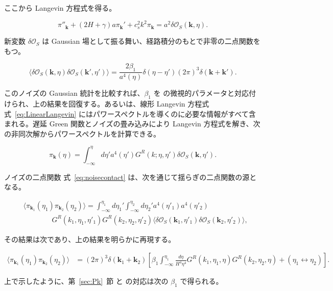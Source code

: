 \documentclass[a4paper,11pt]{ltjsarticle}
\numberwithin{equation}{section}
\def\bfk{\textbf{k}}
\newcommand{\Os}{\delta \mathcal{O}_{S}}
\newcommand{\Eq}[1]{Eq.~(\ref{#1})}
\newcommand{\Eqs}[1]{Eqs.~(\ref{#1})}
\newcommand{\Sec}[1]{Sec.~\ref{#1}}
\renewcommand{\Eq}[1]{式~\eqref{#1}}
\renewcommand{\Eqs}[1]{式~\eqref{#1}}
\renewcommand{\Sec}[1]{第~\ref{#1}~節}
\begin{document}
ここから Langevin 方程式を得る。

\begin{equation}\label{eq:LinearLangevin}
    \pi''_{\bfk} +\left( 2H + \gamma\right)a\pi_{\bfk}'+c_{s}^{2}k^{2}\pi_{\bfk}=a^2 \Os(\bfk, \eta).
\end{equation}

新変数 $\Os$ は Gaussian 場として振る舞い、経路積分のもとで非零の二点関数をもつ。

\begin{equation}\label{eq:noisecontact}
    \langle\Os(\bfk,\eta)\Os(\bfk',\eta')\rangle=\frac{2\beta_{1}}{a^{4}(\eta)}\delta(\eta-\eta')(2\pi)^3\delta(\bfk+\bfk').
\end{equation}

このノイズの Gaussian 統計を比較すれば、$\beta_1$ を \cite{Creminelli:2023aly} の微視的パラメータと対応付けられ、上の結果を回復する。あるいは、線形 Langevin 方程式 \Eqs{eq:LinearLangevin} にはパワースペクトルを導くのに必要な情報がすべて含まれる。遅延 Green 関数とノイズの畳み込みにより Langevin 方程式を解き、次の非同次解からパワースペクトルを計算できる。

\begin{equation}\label{eq:GRxifree}
    \pi_{\bfk}(\eta)=\int_{-\infty}^{\eta}d\eta'a^{4}(\eta')G^R(k;\eta,\eta')\Os(\bfk,\eta').
\end{equation}

ノイズの二点関数 \Eq{eq:noisecontact} は、次を通じて揺らぎの二点関数の源となる。

\begin{align}
    &\langle\pi_{\bfk_{1}}(\eta_{1})\pi_{\bfk_{2}}(\eta_{2})\rangle=\int_{-\infty}^{\eta_{1}}d\eta_{1}'\int_{-\infty}^{\eta_{2}}d\eta_{2}'a^{4}(\eta'_{1})a^{4}(\eta'_{2})\nonumber \\
    &\qquad \qquad  G^{R}(k_1,\eta_{1},\eta'_{1})G^{R}(k_2, \eta_{2},\eta'_{2})\langle\Os(\bfk_{1},\eta'_{1})\Os(\bfk_{2},\eta'_{2})\rangle,
\end{align}

その結果は次であり、上の結果を明らかに再現する。

\begin{align}
    \langle\pi_{\bfk_{1}}(\eta_{1})\pi_{\bfk_{2}}(\eta_{2})\rangle&=(2\pi)^3\delta(\bfk_{1}+\bfk_{2})\left[\beta_{1}\int_{-\infty}^{\eta_{1}} \frac{d\eta}{H^{4}\eta^{4}}G^{R}(k_1,\eta_{1},\eta)G^{R}(k_2, \eta_{2},\eta) +(\eta_{1}\leftrightarrow\eta_{2})\right].
\end{align}

上で示したように、\Sec{sec:Pk} と \cite{Creminelli:2023aly} の対応は次の $\beta_1$ で得られる。
\end{document}
